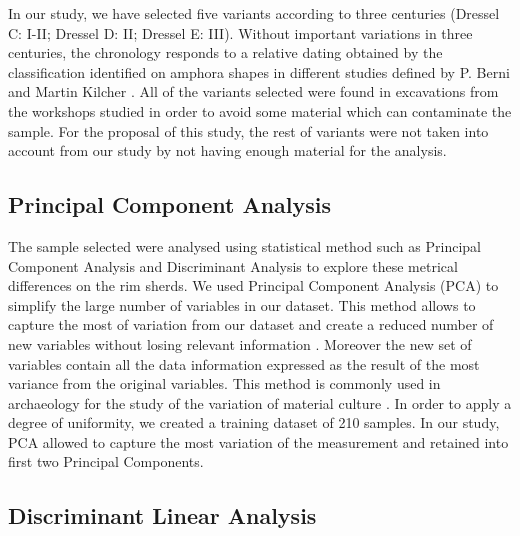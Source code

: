 \documentclass[review]{elsarticle}
\begin{document}
In our study, we have selected five variants according to three centuries (Dressel C: I-II; Dressel D: II; Dressel E: III). Without important variations in three centuries, the chronology responds to a relative dating obtained by the classification identified on amphora shapes in different studies defined by P. Berni \citep{berni_millet_epigrafianforica_2008} and Martin Kilcher \citep{martin-kilcher_romischen_1994}. All of the variants selected were found in excavations from the workshops studied in order to avoid some material which can contaminate the sample. For the proposal of this study, the rest of variants were not taken into account from our study by not having enough material for the analysis. 

\subsection{Principal Component Analysis}

The sample selected were analysed using statistical method such as Principal Component Analysis and Discriminant Analysis to explore these metrical differences on the rim sherds. We used Principal Component Analysis (PCA) to simplify the large number of variables in our dataset. This method allows to capture the most of variation from our dataset and create a reduced number of new variables without losing relevant information \citep{jolliffe_principal_2002, shennan_quantifying_1997}. Moreover the new set of variables contain all the data information expressed as the result of the most variance from the original variables. This method is commonly used in archaeology for the study of the variation of material culture \citep{li_crossbows_2014, schillinger_differences_2016}. In order to apply a degree of uniformity, we created a training dataset of 210 samples. In our study, PCA allowed to capture the most variation of the measurement and retained into first two Principal Components. 


\subsection{Discriminant Linear Analysis} 
\end{document}
